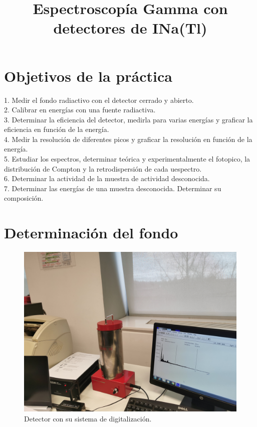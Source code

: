 \documentclass[a4paper,12pt,spanish]{article}
\begin{document}
	
	
	\title{ Espectroscopía Gamma con detectores de INa(Tl) }
	
	
	\date{}
	
	\maketitle
	
	
	\section{Objetivos de la práctica}
	
	\vspace{\baselineskip}
	
	1. Medir el fondo radiactivo con el detector cerrado y abierto.\\
	
	2. Calibrar en energías con una fuente radiactiva.\\
	
	3. Determinar la eficiencia del detector, medirla para varias energías y graficar la eficiencia en función de la energía.\\
	
	4. Medir la resolución de diferentes picos y graficar la resolución en función de la energía.\\
	
	5. Estudiar los espectros, determinar teórica y experimentalmente el fotopico, la distribución de Compton y la retrodispersión de cada uespectro.\\
	
	6. Determinar la actividad de la muestra de actividad desconocida.\\
	
	7. Determinar las energías de una muestra desconocida. Determinar su composición.\\
	
	
	\section{Determinación del fondo}
	
	
\begin{figure}[H]
	\centering
	\includegraphics[width=0.7\linewidth]{../IMG_20240304_110653}
	\caption{Detector con su sistema de digitalización.}
	\label{fig:img20240304110653}
\end{figure}
\end{document}
